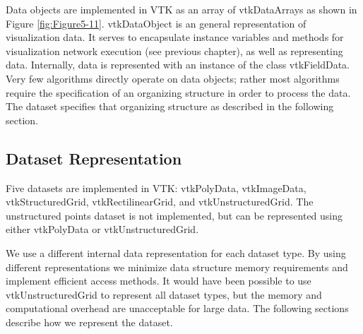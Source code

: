 Data objects are implemented in VTK as an array of vtkDataArrays as shown in Figure \ref{fig:Figure5-11}. vtkDataObject is an general representation of visualization data. It serves to encapsulate instance variables and methods for visualization network execution (see previous chapter), as well as representing data. Internally, data is represented with an instance of the class vtkFieldData. Very few algorithms directly operate on data objects; rather most algorithms require the specification of an organizing structure in order to process the data. The dataset specifies that organizing structure as described in the following section.

\subsection{Dataset Representation}
Five datasets are implemented in VTK: vtkPolyData, vtkImageData, vtkStructuredGrid, vtkRectilinearGrid, and vtkUnstructuredGrid. The unstructured points dataset is not implemented, but can be represented using either vtkPolyData or vtkUnstructuredGrid.

We use a different internal data representation for each dataset type. By using different representations we minimize data structure memory requirements and implement efficient access methods. It would have been possible to use vtkUnstructuredGrid to represent all dataset types, but the memory and computational overhead are unacceptable for large data. The following sections describe how we represent the dataset.

